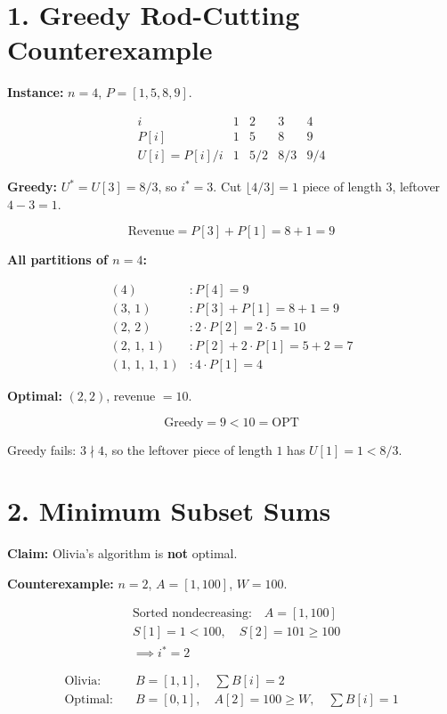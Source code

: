 \documentclass[11pt]{article}
\begin{document}
\section*{1. Greedy Rod-Cutting Counterexample}

\textbf{Instance:} $n = 4$, $P = [1, 5, 8, 9]$.

\[
\begin{array}{c|cccc}
i & 1 & 2 & 3 & 4 \\ \hline
P[i] & 1 & 5 & 8 & 9 \\[2pt]
U[i] = P[i]/i & 1 & 5/2 & 8/3 & 9/4
\end{array}
\]

\textbf{Greedy:} $U^* = U[3] = 8/3$, so $i^* = 3$.
Cut $\lfloor 4/3 \rfloor = 1$ piece of length $3$, leftover $4 - 3 = 1$.

\[
\text{Revenue} = P[3] + P[1] = 8 + 1 = 9
\]

\textbf{All partitions of $n = 4$:}

\begin{align*}
(4) &: P[4] = 9 \\
(3,\, 1) &: P[3] + P[1] = 8 + 1 = 9 \\
(2,\, 2) &: 2 \cdot P[2] = 2 \cdot 5 = 10 \\
(2,\, 1,\, 1) &: P[2] + 2 \cdot P[1] = 5 + 2 = 7 \\
(1,\, 1,\, 1,\, 1) &: 4 \cdot P[1] = 4
\end{align*}

\textbf{Optimal:} $(2, 2)$, revenue $= 10$.

\[
\boxed{\text{Greedy} = 9 < 10 = \text{OPT}}
\]

Greedy fails: $3 \nmid 4$, so the leftover piece of length $1$ has $U[1] = 1 < 8/3$.


\section*{2. Minimum Subset Sums}

\textbf{Claim:} Olivia's algorithm is \textbf{not} optimal.

\textbf{Counterexample:} $n = 2$, $A = [1, 100]$, $W = 100$.

\begin{align*}
&\text{Sorted nondecreasing:} \quad A = [1, 100] \\
&S[1] = 1 < 100, \quad S[2] = 101 \ge 100 \\
&\implies i^* = 2
\end{align*}

\begin{align*}
\text{Olivia:} \quad & B = [1, 1], \quad \textstyle\sum B[i] = 2 \\
\text{Optimal:} \quad & B = [0, 1], \quad A[2] = 100 \ge W, \quad \textstyle\sum B[i] = 1
\end{align*}
\end{document}
